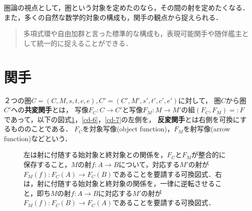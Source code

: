 \documentclass[uplatex, dvipdfmx]{jsreport}
\begin{document}
圏論の視点として，圏という対象を定めたのなら，その間の射を定めたくなる．
また，多くの自然な数学的対象の構成も，関手の観点から捉えられる．
\begin{quotation}
    多項式環や自由加群と言った標準的な構成も，表現可能関手や随伴艦主として統一的に捉えることができる．\cite{数学原論}
\end{quotation}

\section{関手}

\begin{definition}
    ２つの圏$C=(C,M,s,t,c,e),C'=(C',M',s',t',c',e')$に対して，
    圏$C$から圏$C'$への\textbf{共変関手}とは，
    写像$F_C:C\rightarrow C'$と写像$F_M:M\rightarrow M'$の組$(F_C,F_M)=:F$であって，以下の図式\ref{cd-5}，\ref{cd-6}，\ref{cd-7}の左側を，
    \textbf{反変関手}とは右側を可換にするもののことである．
    $F_C$を対象写像(object function)，$F_M$を射写像(arrow function)などという．
\end{definition}

\begin{figure}[ht]\begin{center} \caption{\label{cd-5}左は射に付随する始対象と終対象との関係を，$F_C$と$F_M$が整合的に保存すること，$M$の射$f:A\to B$について，対応する$M'$の射が$F_M(f):F_C(A)\to F_C(B)$であることを要請する可換図式．右は，射に付随する始対象と終対象の関係を，一律に逆転させること，即ち$M$の射$f:A\to B$に対応する$M'$の射が$F_M(f):F_C(B)\to F_C(A)$であることを要請する可換図式．}
\end{center}\end{figure}
\end{document}
